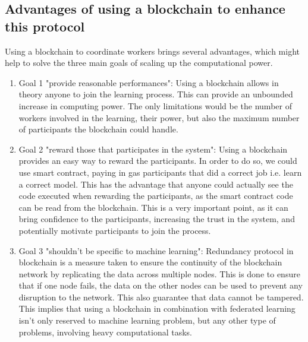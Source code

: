 \documentclass{article}
\begin{document}
\subsection{Advantages of using a blockchain to enhance this protocol}
Using a blockchain to coordinate workers brings several advantages, which might help to solve the three main goals of
scaling up the computational power.
\begin{enumerate}
    \item Goal 1 "provide reasonable performances": Using a blockchain allows in theory anyone to join the learning
process. This can provide an unbounded increase in computing power. The only limitations would be the number of workers
involved in the learning, their power, but also the maximum number of participants the blockchain could handle.
    \item Goal 2 "reward those that participates in the system": Using a blockchain provides an easy way to reward the
participants. In order to do so, we could use smart contract, paying in gas participants that did a correct job i.e.
learn a correct model. This has the advantage that anyone could actually see the code executed when rewarding the
participants, as the smart contract code can be read from the blockchain. This is a very important point,
as it can bring confidence to the participants, increasing the trust in the system, and potentially motivate participants
to join the process.
    \item Goal 3 "shouldn't be specific to machine learning": Redundancy protocol in blockchain is a measure taken to
ensure the continuity of the blockchain network by replicating the data across multiple nodes. This is done to ensure
that if one node fails, the data on the other nodes can be used to prevent any disruption to the network. This also
guarantee that data cannot be tampered. This implies that using a blockchain in combination with federated learning
isn't only reserved to machine learning problem, but any other type of problems, involving heavy computational tasks.
\end{enumerate}
\end{document}
